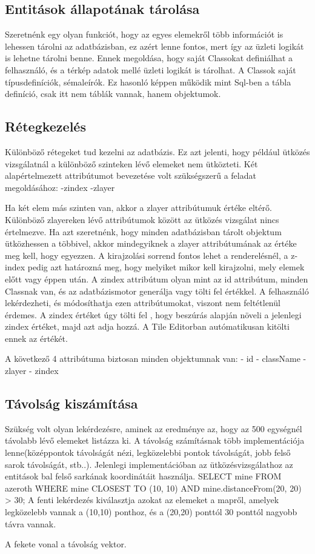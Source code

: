 \subsection{Entitások állapotának tárolása}

Szeretnénk egy olyan funkciót, hogy az egyes elemekről több információt is lehessen tárolni az adatbázisban, ez azért lenne fontos, mert így az üzleti logikát is lehetne tárolni benne. Ennek megoldása, hogy saját Classokat definiálhat a felhasználó, és a térkép adatok mellé üzleti logikát is tárolhat. A Classok saját típusdefiníciók, sémaleírók. Ez hasonló képpen működik mint Sql-ben a tábla definíció, csak itt nem táblák vannak, hanem objektumok.

\subsection{Rétegkezelés}

Különböző rétegeket tud kezelni az adatbázis. Ez azt jelenti, hogy például ütközés vizsgálatnál a különböző szinteken lévő elemeket nem ütközteti. Két alapértelmezett attribútumot bevezetése volt szükségszerű a feladat megoldásához:
-zindex
-zlayer

Ha két elem más szinten van, akkor a zlayer attribútumuk értéke eltérő. Különböző zlayereken lévő attribútumok között az ütközés vizsgálat nincs értelmezve. Ha azt szeretnénk, hogy minden adatbázisban tárolt objektum ütközhessen a többivel, akkor mindegyiknek a zlayer attribútumának az értéke meg kell, hogy egyezzen.
A kirajzolási sorrend fontos lehet a renderelésnél, a z-index pedig azt határozná meg, hogy melyiket mikor kell kirajzolni, mely elemek előtt vagy éppen után. A zindex attribútum olyan mint az id attribútum, minden Classnak van, és az adatbázismotor generálja vagy tölti fel értékkel. A felhasználó lekérdezheti, és módosíthatja ezen attribútumokat, viszont nem feltétlenül érdemes. A zindex értéket úgy tölti fel , hogy beszúrás alapján növeli a jelenlegi zindex értéket, majd azt adja hozzá. A Tile Editorban autómatikusan kitölti ennek az értékét.

A következő 4 attribútuma biztosan minden objektumnak van:
- id
- className
- zlayer
- zindex

\subsection{Távolság kiszámítása}

Szükség volt olyan lekérdezésre, aminek az eredménye az, hogy az 500 egységnél távolabb lévő elemeket listázza ki. A távolság számításnak több implementációja lenne(középpontok távolságát nézi, legközelebbi pontok távolságát, jobb felső sarok távolságát, stb..). Jelenlegi implementációban az ütközésvizsgálathoz az entitások bal felső sarkának koordinátáit használja.
SELECT mine
FROM azeroth
WHERE mine CLOSEST TO (10, 10) AND mine.distanceFrom(20, 20) > 30;
A fenti lekérdezés kiválasztja azokat az elemeket a mapről, amelyek legközelebb vannak a (10,10) ponthoz, és a  (20,20) ponttól 30 ponttól nagyobb távra vannak.

A fekete vonal a távolság vektor.

